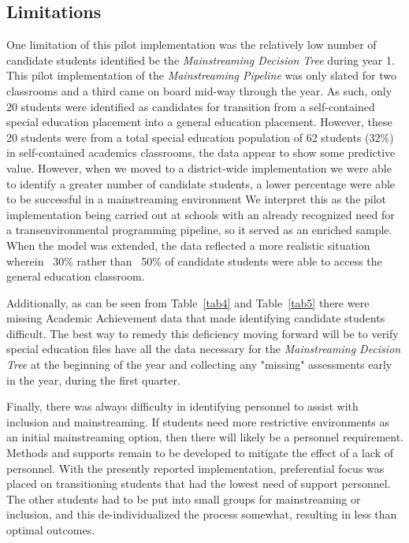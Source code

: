 \documentclass[twoside]{article}
\begin{document}
\subsection{Limitations}
One limitation of this pilot implementation was the relatively low number of candidate students identified be the \textit{Mainstreaming Decision Tree} during year 1. This pilot implementation of the \textit{Mainstreaming Pipeline} was only slated for two classrooms and a third came on board mid-way through the year. As such, only 20 students were identified as candidates for transition from a self-contained special education placement into a general education placement. However, these 20 students were from a total special education population of 62 students (32\%) in self-contained academics classrooms, the data appear to show some predictive value. However, when we moved to a district-wide implementation we were able to identify a greater number of candidate students, a lower percentage were able to be successful in a mainstreaming environment We interpret this as the pilot implementation being carried out at schools with an already recognized need for a transenvironmental programming pipeline, so it served as an enriched sample. When the model was extended, the data reflected a more realistic situation wherein ~30\% rather than ~50\% of candidate students were able to access the general education classroom. 

Additionally, as can be seen from Table~\ref{tab4} and Table~\ref{tab5} there were missing Academic Achievement data that made identifying candidate students difficult. The best way to remedy this deficiency moving forward will be to verify special education files have all the data necessary for the \textit{Mainstreaming Decision Tree} at the beginning of the year and collecting any "missing" assessments early in the year, during the first quarter.

Finally, there was always difficulty in identifying personnel to assist with inclusion and mainstreaming. If students need more restrictive environments as an initial mainstreaming option, then there will likely be a personnel requirement. Methods and supports remain to be developed to mitigate the effect of a lack of personnel. With the presently reported implementation, preferential focus was placed on transitioning students that had the lowest need of support personnel. The other students had to be put into small groups for mainstreaming or inclusion, and this de-individualized the process somewhat, resulting in less than optimal outcomes. 
\end{document}
